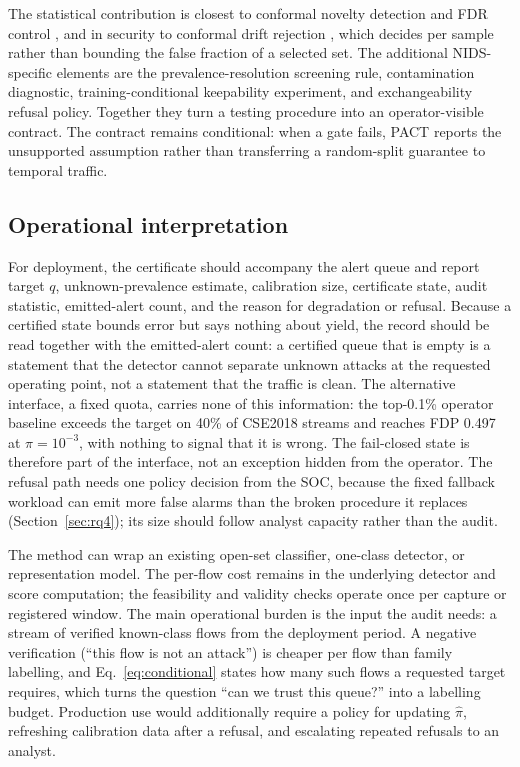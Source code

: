 \documentclass[a4paper,fleqn]{cas-dc}
\newcommand{\PACT}{PACT\xspace}
\begin{document}
The statistical contribution is closest to conformal novelty detection and FDR control \cite{bates2023outliers,aos2024adaptive,bashari2023derandomized}, and in security to conformal drift rejection \cite{jordaney2017transcend,barbero2022transcending}, which decides per sample rather than bounding the false fraction of a selected set. The additional NIDS-specific elements are the prevalence-resolution screening rule, contamination diagnostic, training-conditional keepability experiment, and exchangeability refusal policy. Together they turn a testing procedure into an operator-visible contract. The contract remains conditional: when a gate fails, \PACT reports the unsupported assumption rather than transferring a random-split guarantee to temporal traffic.

\subsection{Operational interpretation}
For deployment, the certificate should accompany the alert queue and report target $q$, unknown-prevalence estimate, calibration size, certificate state, audit statistic, emitted-alert count, and the reason for degradation or refusal. Because a certified state bounds error but says nothing about yield, the record should be read together with the emitted-alert count: a certified queue that is empty is a statement that the detector cannot separate unknown attacks at the requested operating point, not a statement that the traffic is clean. The alternative interface, a fixed quota, carries none of this information: the top-0.1\% operator baseline exceeds the target on 40\% of CSE2018 streams and reaches FDP 0.497 at $\pi=10^{-3}$, with nothing to signal that it is wrong. The fail-closed state is therefore part of the interface, not an exception hidden from the operator. The refusal path needs one policy decision from the SOC, because the fixed fallback workload can emit more false alarms than the broken procedure it replaces (Section~\ref{sec:rq4}); its size should follow analyst capacity rather than the audit.

The method can wrap an existing open-set classifier, one-class detector, or representation model. The per-flow cost remains in the underlying detector and score computation; the feasibility and validity checks operate once per capture or registered window. The main operational burden is the input the audit needs: a stream of verified known-class flows from the deployment period. A negative verification (``this flow is not an attack'') is cheaper per flow than family labelling, and Eq.~\eqref{eq:conditional} states how many such flows a requested target requires, which turns the question ``can we trust this queue?'' into a labelling budget. Production use would additionally require a policy for updating $\hat\pi$, refreshing calibration data after a refusal, and escalating repeated refusals to an analyst.
\end{document}
